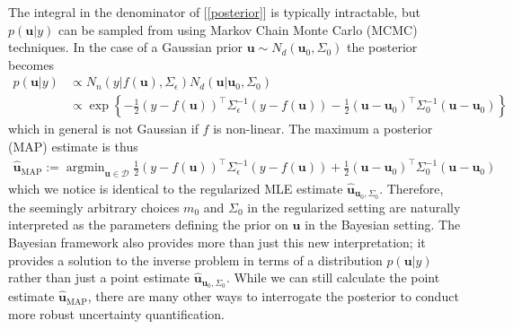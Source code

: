 \documentclass[12pt]{article}
\newcommand{\bpar}{\mathbf{u}} %
\DeclareMathOperator*{\argmin}{argmin}
\begin{document}
The integral in the denominator of [\ref{posterior}] is typically intractable, but $p(\bpar|y)$ can be sampled from using Markov Chain Monte Carlo (MCMC) techniques. In the case of a Gaussian prior 
$\bpar \sim N_d(\bpar_0, \Sigma_0)$ the posterior becomes
\begin{align}
p(\bpar|y) &\propto N_n(y|f(\bpar), \Sigma_\epsilon)N_d(\bpar|\bpar_0, \Sigma_0) \\
 		&\propto \exp\left\{-\frac{1}{2} (y - f(\bpar))^{\top} \Sigma_\epsilon^{-1} (y - f(\bpar)) - \frac{1}{2} (\bpar - \bpar_0)^{\top} \Sigma_0^{-1}(\bpar - \bpar_0) \right\} \nonumber
\end{align}
which in general is not Gaussian if $f$ is non-linear. The maximum a posterior (MAP) estimate is thus
\begin{align}
\hat{\bpar}_{\text{MAP}} := \argmin_{\bpar \in \mathcal{D}} \frac{1}{2} (y - f(\bpar))^{\top} \Sigma_\epsilon^{-1} (y - f(\bpar)) + \frac{1}{2} (\bpar - \bpar_0)^{\top} \Sigma_0^{-1}(\bpar - \bpar_0) \label{MAP}
\end{align}
which we notice is identical to the regularized MLE estimate $\hat{\bpar}_{\bpar_0, \Sigma_0}$. Therefore, the seemingly arbitrary choices $m_0$ and $\Sigma_0$ in the regularized setting are naturally 
interpreted as the parameters defining the prior on $\bpar$ in the Bayesian setting. The Bayesian framework also provides more than just this new interpretation; it provides a solution to the inverse problem 
in terms of a distribution $p(\bpar|y)$ rather than just a point estimate $\hat{\bpar}_{\bpar_0, \Sigma_0}$. While we can still calculate the point estimate $\hat{\bpar}_{\text{MAP}}$, there are many other ways 
to interrogate the posterior to conduct more robust uncertainty quantification. 
\end{document}
